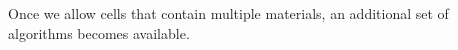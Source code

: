 \documentclass[fontsize=11pt, appendixprefix=true]{scrreprt}
\begin{document}
Once we allow cells that contain multiple materials, an additional set of
algorithms becomes available.








\end{document}
